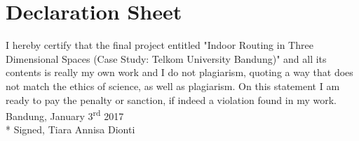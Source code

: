 \chapter*{Declaration Sheet}

	\begin{center}
	\end{center}
	\par I hereby certify that the final project entitled "Indoor Routing in Three Dimensional Spaces (Case Study: Telkom University Bandung)" and all its contents is really my own work and I do not plagiarism, quoting a way that does not match the ethics of science, as well as plagiarism. On this statement I am ready to pay the penalty or sanction, if indeed a violation found in my work.
	\newline
	\newline
	\newline
	Bandung, January 3\textsuperscript{rd} 2017
	\\*
	Signed,
	\newline
	\newline
	\newline
	\newline
	\newline
	Tiara Annisa Dionti
